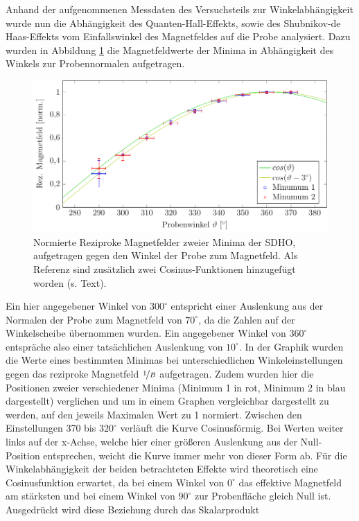 

Anhand der aufgenommenen Messdaten des Versuchsteils zur Winkelabhängigkeit wurde nun die Abhängigkeit des Quanten-Hall-Effekts, sowie des Shubnikov-de Haas-Effekts vom Einfallswinkel des Magnetfeldes auf die Probe analysiert.
Dazu wurden in Abbildung \ref{fig:winkel_ausw} die Magnetfeldwerte der Minima in Abhängigkeit des Winkels zur Probennormalen aufgetragen.
\begin{figure}[h]
	\centering
	\includegraphics[scale=1]{graphs/winkel/auswertung.pdf}
	\caption[Auswertung der Winkelvariation]{
		Normierte Reziproke Magnetfelder zweier Minima der SDHO, aufgetragen gegen den Winkel der Probe zum Magnetfeld. Als Referenz sind zusätzlich zwei Cosinus-Funktionen hinzugefügt worden (s. Text).
	}
	\label{fig:winkel_ausw}
\end{figure}
Ein hier angegebener Winkel von $300^\circ$ entspricht einer Auslenkung aus der Normalen der Probe zum Magnetfeld von $70^\circ$, da die Zahlen auf der Winkelscheibe übernommen wurden. Ein angegebener Winkel von $360^\circ$ entspräche also einer tatsächlichen Auslenkung von $10^\circ$. 
In der Graphik wurden die Werte eines bestimmten Minimas bei unterschiedlichen Winkeleinstellungen gegen das reziproke Magnetfeld $\nicefrac{1}{B}$ aufgetragen. Zudem wurden hier die Positionen zweier verschiedener Minima (Minimum 1 in rot, Minimum 2 in blau dargestellt) verglichen und um in einem Graphen vergleichbar dargestellt zu werden, auf den jeweils Maximalen Wert zu 1 normiert. 
Zwischen den Einstellungen 370 bis $320^{\circ}$ verläuft die Kurve Cosinusförmig. Bei Werten weiter links auf der x-Achse, welche hier einer größeren Auslenkung aus der Null-Position entsprechen, weicht die Kurve immer mehr von dieser Form ab. Für die Winkelabhängigkeit der beiden betrachteten Effekte wird theoretisch eine Cosinusfunktion erwartet, da bei einem Winkel von $0^{\circ}$ das effektive Magnetfeld am stärksten und bei einem Winkel von $90^{\circ}$ zur Probenfläche gleich Null ist. Ausgedrückt wird diese Beziehung durch das Skalarprodukt

